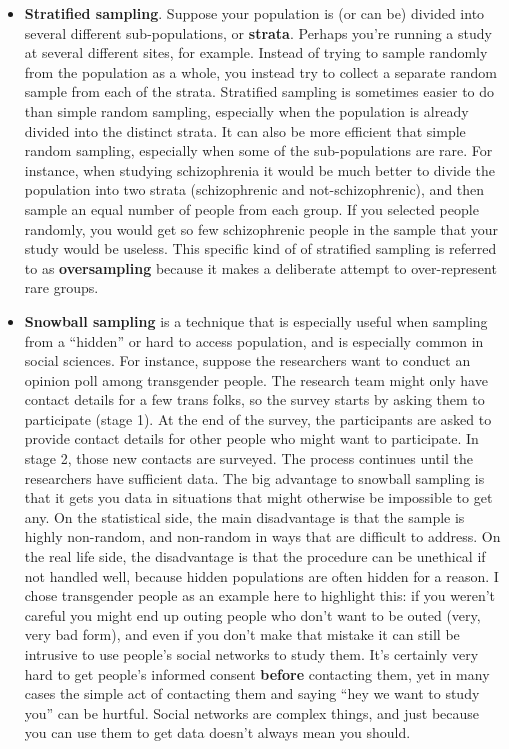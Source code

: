 \documentclass[]{book}
\begin{document}
\begin{itemize}
\item
  \textbf{Stratified sampling}. Suppose your population is (or can be) divided into several different sub-populations, or \textbf{strata}. Perhaps you're running a study at several different sites, for example. Instead of trying to sample randomly from the population as a whole, you instead try to collect a separate random sample from each of the strata. Stratified sampling is sometimes easier to do than simple random sampling, especially when the population is already divided into the distinct strata. It can also be more efficient that simple random sampling, especially when some of the sub-populations are rare. For instance, when studying schizophrenia it would be much better to divide the population into two strata (schizophrenic and not-schizophrenic), and then sample an equal number of people from each group. If you selected people randomly, you would get so few schizophrenic people in the sample that your study would be useless. This specific kind of of stratified sampling is referred to as \textbf{oversampling} because it makes a deliberate attempt to over-represent rare groups.
\item
  \textbf{Snowball sampling} is a technique that is especially useful when sampling from a ``hidden'' or hard to access population, and is especially common in social sciences. For instance, suppose the researchers want to conduct an opinion poll among transgender people. The research team might only have contact details for a few trans folks, so the survey starts by asking them to participate (stage 1). At the end of the survey, the participants are asked to provide contact details for other people who might want to participate. In stage 2, those new contacts are surveyed. The process continues until the researchers have sufficient data. The big advantage to snowball sampling is that it gets you data in situations that might otherwise be impossible to get any. On the statistical side, the main disadvantage is that the sample is highly non-random, and non-random in ways that are difficult to address. On the real life side, the disadvantage is that the procedure can be unethical if not handled well, because hidden populations are often hidden for a reason. I chose transgender people as an example here to highlight this: if you weren't careful you might end up outing people who don't want to be outed (very, very bad form), and even if you don't make that mistake it can still be intrusive to use people's social networks to study them. It's certainly very hard to get people's informed consent \textbf{before} contacting them, yet in many cases the simple act of contacting them and saying ``hey we want to study you'' can be hurtful. Social networks are complex things, and just because you can use them to get data doesn't always mean you should.

\end{itemize}
\end{document}
